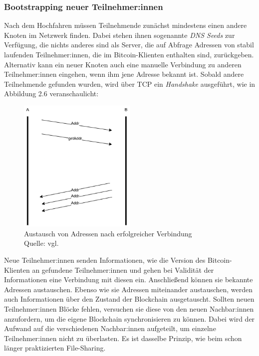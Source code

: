 \subsubsection{Bootstrapping neuer Teilnehmer:innen}
Nach dem Hochfahren müssen Teilnehmende zunächst mindestens einen andere Knoten im Netzwerk finden. Dabei stehen ihnen sogenannte \emph{DNS Seeds} zur Verfügung, die nichts anderes sind als Server, die auf Abfrage Adressen von stabil laufenden Teilnehmer:innen, die im Bitcoin-Klienten enthalten sind, zurückgeben.
Alternativ kann ein neuer Knoten auch eine manuelle Verbindung zu anderen Teilnehmer:innen eingehen, wenn ihm jene Adresse bekannt ist.
Sobald andere Teilnehmende gefunden wurden, wird über TCP ein \emph{Handshake} ausgeführt, wie in Abbildung 2.6 veranschaulicht: 
\begin{figure}[htpb]
	\centering
	\includegraphics[width=0.5\textwidth]{images/adress_query.png}
	\caption{Austausch von Adressen nach erfolgreicher Verbindung\\
		Quelle: vgl. \cite[S. 177]{antanopoulos_2014}}
	\label{6braun:fig:adress_query}
\end{figure}
\newpage
Neue Teilnehmer:innen senden Informationen, wie die Version des Bitcoin-Klienten an gefundene Teilnehmer:innen und gehen bei Validität der Informationen eine Verbindung mit diesen ein.
Anschließend können sie bekannte Adressen austauschen.
Ebenso wie sie Adressen miteinander austauschen, werden auch Informationen über den Zustand der Blockchain ausgetauscht. Sollten neuen Teilnehmer:innen Blöcke fehlen, versuchen sie diese von den neuen Nachbar:innen anzufordern, um die eigene Blockchain synchronisieren zu können. Dabei wird der Aufwand auf die verschiedenen Nachbar:innen aufgeteilt, um einzelne Teilnehmer:innen nicht zu überlasten. Es ist dasselbe Prinzip, wie beim schon länger praktizierten File-Sharing.
